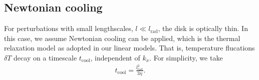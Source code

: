 \subsection{Newtonian cooling}\label{newton_cool}
For perturbations with small lengthscales, $l\ll l_\mathrm{rad}$, 
the disk is optically thin. In this case, we assume 
Newtonian cooling can be applied, which is the thermal
relaxation model as adopted in our linear models. That is, temperature
flucations $\delta T$ decay on a timescale $t_\mathrm{cool}$,
independent of $k_x$. For simplicity, we take  
\begin{align}
t_\mathrm{cool} = \frac{l_\mathrm{rad}^2}{3\eta}. 
\end{align}

